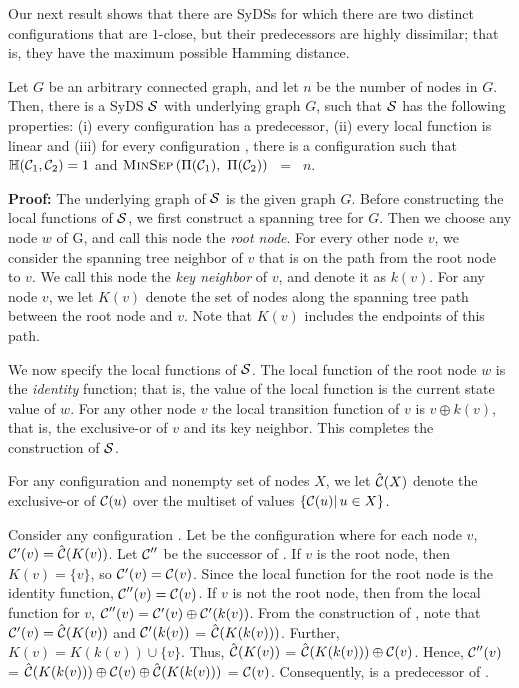Our next result shows that there are SyDSs for which 
there are two distinct configurations that are $1$-close, but
their predecessors are highly dissimilar; that is, they have 
the maximum possible Hamming distance.

\begin{proposition}\label{pro:close-far}
Let $G$ be an arbitrary connected graph, 
and let $n$ be the number of nodes in $G$.
Then, there is a SyDS $\mbox{$\mathcal{S}$}${} with underlying graph $G$,
such that $\mbox{$\mathcal{S}$}${} has the following properties: 
(i) every configuration has a predecessor, 
(ii) every local function is linear and
(iii) for every configuration
\calcone, there is a configuration \calctwo{} such that 
$\mbox{$\mathbb{H}$}(\mbox{$\mathcal{C}_{1}$}, \mbox{$\mathcal{C}_{2}$}) = 1$ and 
$\mbox{\textsc{MinSep}}\left( \mbox{$\Pi(\mbox{$\mathcal{C}_{1}$})$},~ \mbox{$\Pi(\mbox{$\mathcal{C}_{2}$})$} \right)$ ~=~ $n$.
\end{proposition}

\noindent
\textbf{Proof:} 
The underlying graph of $\mbox{$\mathcal{S}$}${}  is the given graph $G$.
Before constructing the local functions of $\mbox{$\mathcal{S}$}${}, 
we first construct a  spanning tree for $G$.
Then we choose any node $w$ of G, and call this node the {\em root node}.
For every other node $v$,
we consider the spanning tree neighbor of $v$ 
that is on the path from the root node to $v$.
We call this node the {\em key neighbor} of $v$, 
and denote it as $k(v)$.  
For any node $v$,
we let $K(v)$ denote the set of nodes along 
the spanning tree path between the root node and $v$.
Note that $K(v)$ includes the endpoints of this path.

We now specify the local functions of $\mbox{$\mathcal{S}$}${}.
The local function of the root node $w$ is the \emph{identity} function;
that is, the value of the local function is the current state value of $w$.
For any other node $v$ the local transition function of $v$ is $v \oplus k(v)$, that is,
the exclusive-or of $v$ and its key neighbor.
This completes the construction of $\mbox{$\mathcal{S}$}${}.

For any configuration \calc{} and nonempty set of nodes  $X$,
we let $\hat{\mbox{$\mathcal{C}$}}(X)$ denote the exclusive-or of $\mbox{$\mathcal{C}$}(u)$ 
over the multiset of values  $\{\mbox{$\mathcal{C}$}(u) | \, u \in X\}$.

Consider any configuration \calc.
Let \calcp{} be the configuration where for each node $v$, 
$\mbox{$\mathcal{C'}$}(v) = \hat{\mbox{$\mathcal{C}$}}(K(v))$.
Let $\mbox{$\mathcal{C}$}''$ be the successor of \calcp.
If $v$ is the root node, then $K(v) = \{v\}$, so $\mbox{$\mathcal{C'}$}(v) = \mbox{$\mathcal{C}$}(v)$.
Since the local function for the root node is the identity function,
$\mbox{$\mathcal{C}$}''(v) = \mbox{$\mathcal{C}$}(v)$.
If $v$ is not the root node, then from the local function for $v$,
$\mbox{$\mathcal{C}$}''(v) = \mbox{$\mathcal{C'}$}(v)  \oplus \mbox{$\mathcal{C'}$}(k(v))$.
From the construction of \calcp, note that
$\mbox{$\mathcal{C'}$}(v) = \hat{\mbox{$\mathcal{C}$}}(K(v))$ and $\mbox{$\mathcal{C'}$}(k(v))$ =  
$\hat{\mbox{$\mathcal{C}$}}(K(k(v)))$.
Further, $K(v) = K(k(v)) \cup \{v\}$.
Thus, $\hat{\mbox{$\mathcal{C}$}}(K(v))$ = $\hat{\mbox{$\mathcal{C}$}}(K(k(v))) \oplus \mbox{$\mathcal{C}$}(v)$.
Hence, $\mbox{$\mathcal{C}$}''(v)$ = $\hat{\mbox{$\mathcal{C}$}}(K(k(v))) \oplus \mbox{$\mathcal{C}$}(v) \oplus  \hat{\mbox{$\mathcal{C}$}}(K(k(v)))$
= $\mbox{$\mathcal{C}$}(v)$.
Consequently, \calcp{} is a predecessor of \calc.

